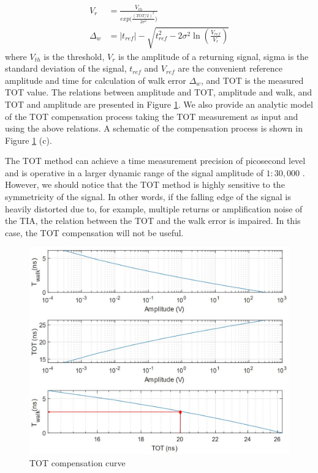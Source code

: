 \begin{align}
    V_r&=\frac{V_{th}}{exp\big(\frac{(TOT/2)^2}{2\sigma^2}\big)}\\
    \Delta_w&=|t_{ref}|-\sqrt{t_{ref}^2-2\sigma^2\ln(\frac{V_{ref}}{V_r})}
\end{align}
where $V_{th}$ is the threshold, $V_r$ is the amplitude of a returning signal, sigma is the standard deviation of the signal, $t_{ref}$ and $V_{ref}$ are the convenient reference amplitude and time for calculation of walk error $\Delta_w$, and TOT is the measured TOT value. The relations between amplitude and TOT, amplitude and walk, and TOT and amplitude are presented in Figure \ref{fig:TDC_TOTcurve}. We also provide an analytic model of the TOT compensation process taking the TOT measurement as input and using the above relations. A schematic of the compensation process is shown in Figure \ref{fig:TDC_TOTcurve} (c).\par
The TOT method can achieve a time measurement precision of picosecond level and is operative in a larger dynamic range of the signal amplitude of $1: 30,000$ \citep{Kurtti2009PulseRangefinder}. However, we should notice that the TOT method is highly sensitive to the symmetricity of the signal. In other words, if the falling edge of the signal is heavily distorted due to, for example, multiple returns or amplification noise of the TIA, the relation between the TOT and the walk error is impaired. In this case, the TOT compensation will not be useful. 
\begin{figure}[t!p]
\centering
\includegraphics[width=1\textwidth]{figures/chapter3_TDC/TOT_curve.jpg}
\caption{TOT compensation curve}
\label{fig:TDC_TOTcurve}
\end{figure}
